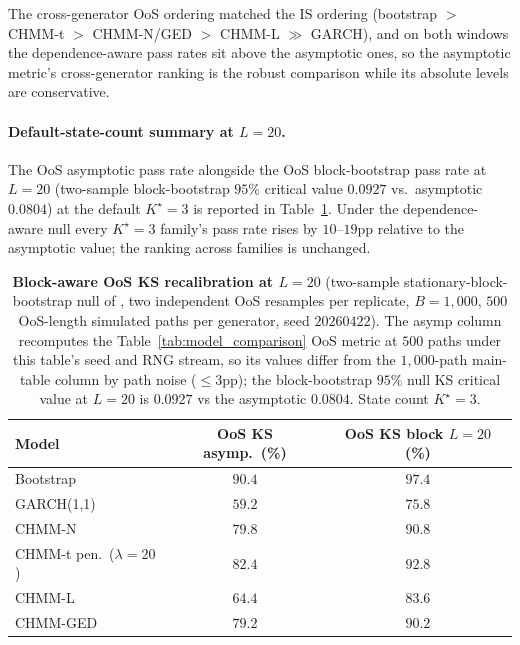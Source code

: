 The cross-generator OoS ordering matched the IS ordering (bootstrap $>$ CHMM-t $>$ CHMM-N/GED $>$ CHMM-L $\gg$ GARCH), and on both windows the dependence-aware pass rates sit above the asymptotic ones, so the asymptotic metric's cross-generator ranking is the robust comparison while its absolute levels are conservative.

\paragraph{Default-state-count summary at $L = 20$.}
The OoS asymptotic pass rate alongside the OoS block-bootstrap pass rate at $L = 20$ (two-sample block-bootstrap $95\%$ critical value $0.0927$ vs.\ asymptotic $0.0804$) at the default $K^\star = 3$ is reported in Table~\ref{tab:ks_block_body}. Under the dependence-aware null every $K^\star = 3$ family's pass rate rises by $10$--$19$pp relative to the asymptotic value; the ranking across families is unchanged.

\begin{table}[t]
\centering
\small
\caption{\textbf{Block-aware OoS KS recalibration at $L = 20$} (two-sample stationary-block-bootstrap null of \citealp{politis1994stationary}, two independent OoS resamples per replicate, $B = 1{,}000$, $500$ OoS-length simulated paths per generator, seed $20260422$). The asymp column recomputes the Table~\ref{tab:model_comparison} OoS metric at $500$ paths under this table's seed and RNG stream, so its values differ from the $1{,}000$-path main-table column by path noise ($\le 3$pp); the block-bootstrap $95\%$ null KS critical value at $L = 20$ is $0.0927$ vs the asymptotic $0.0804$. State count $K^\star = 3$.}
\label{tab:ks_block_body}
\begin{tabular}{l c c}
\toprule
Model & OoS KS asymp.\ (\%) & OoS KS block $L = 20$ (\%) \\
\midrule
Bootstrap                                & $90.4$ & $97.4$ \\
GARCH(1,1)                               & $59.2$ & $75.8$ \\
CHMM-N                                   & $79.8$ & $90.8$ \\
CHMM-t pen.\ ($\lambda = 20$)            & $\mathbf{82.4}$ & $\mathbf{92.8}$ \\
CHMM-L                                   & $64.4$ & $83.6$ \\
CHMM-GED                                 & $79.2$ & $90.2$ \\
\bottomrule
\end{tabular}
\end{table}

